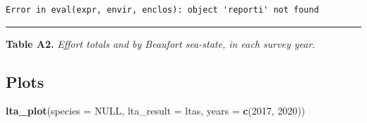 \documentclass[
]{book}
\newenvironment{Shaded}{\begin{snugshade}}{\end{snugshade}}
\newcommand{\AttributeTok}[1]{\textcolor[rgb]{0.13,0.29,0.53}{#1}}
\newcommand{\ConstantTok}[1]{\textcolor[rgb]{0.56,0.35,0.01}{#1}}
\newcommand{\ControlFlowTok}[1]{\textcolor[rgb]{0.13,0.29,0.53}{\textbf{#1}}}
\newcommand{\DecValTok}[1]{\textcolor[rgb]{0.00,0.00,0.81}{#1}}
\newcommand{\FunctionTok}[1]{\textcolor[rgb]{0.13,0.29,0.53}{\textbf{#1}}}
\newcommand{\NormalTok}[1]{#1}
\newcommand{\SpecialCharTok}[1]{\textcolor[rgb]{0.81,0.36,0.00}{\textbf{#1}}}
\newcommand{\StringTok}[1]{\textcolor[rgb]{0.31,0.60,0.02}{#1}}
\begin{document}
\begin{Shaded}
\end{Shaded}

\begin{verbatim}
Error in eval(expr, envir, enclos): object 'reporti' not found
\end{verbatim}

\begin{center}\rule{0.5\linewidth}{0.5pt}\end{center}

\textbf{Table A2.} \emph{Effort totals and by Beaufort sea-state, in each survey year}.

\begin{Shaded}
\end{Shaded}

\hypertarget{plots-1}{%
\subsection*{Plots}\label{plots-1}}

\begin{Shaded}
\begin{Highlighting}[]
\FunctionTok{lta\_plot}\NormalTok{(}\AttributeTok{species =} \ConstantTok{NULL}\NormalTok{, }
         \AttributeTok{lta\_result =}\NormalTok{ ltas, }
         \AttributeTok{years =} \FunctionTok{c}\NormalTok{(}\DecValTok{2017}\NormalTok{, }\DecValTok{2020}\NormalTok{))}
\end{Highlighting}
\end{Shaded}
\end{document}

